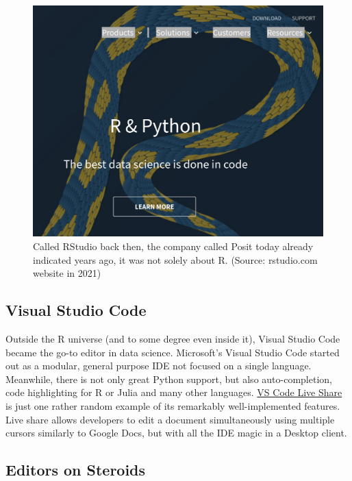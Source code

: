 \documentclass[
  12pt,
  letterpaper,
]{krantz}
\begin{document}
\begin{figure}

{\centering \includegraphics{./images/rstudio_r_py.png}

}

\caption{Called RStudio back then, the company called Posit today
already indicated years ago, it was not solely about R. (Source:
rstudio.com website in 2021)}

\end{figure}

\hypertarget{visual-studio-code}{%
\subsection{Visual Studio Code}\label{visual-studio-code}}

Outside the R universe (and to some degree even inside it), Visual
Studio Code became the go-to editor in data science. Microsoft's Visual
Studio Code started out as a modular, general purpose IDE not focused on
a single language. Meanwhile, there is not only great Python support,
but also auto-completion, code highlighting for R or Julia and many
other languages.
\href{https://visualstudio.microsoft.com/services/live-share/}{VS Code
Live Share} is just one rather random example of its remarkably
well-implemented features. Live share allows developers to edit a
document simultaneously using multiple cursors similarly to Google Docs,
but with all the IDE magic in a Desktop client.

\hypertarget{editors-on-steroids}{%
\subsection{Editors on Steroids}\label{editors-on-steroids}}
\end{document}
